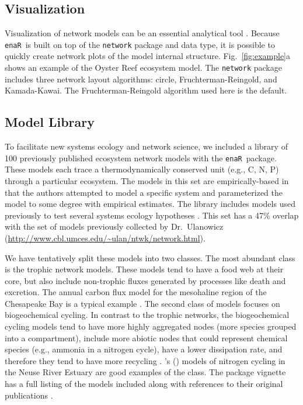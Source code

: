 \documentclass[11pt]{article}
\def\citeapos#1{\citeauthor{#1}'s (\citeyear{#1})}
\newcommand{\enaR}{\texttt{enaR}}
\begin{document}
\begin{spacing}{2}
\subsection{Visualization}
Visualization of network models can be an essential analytical tool
\citep{moody05dynamic,lima2011visual}.  Because \enaR\ is built on top
of the \texttt{network} package and data type, it is possible to
quickly create network plots of the model internal structure.
Fig.~\ref{fig:example}a shows an example of the Oyster Reef ecosystem
model.  The \texttt{network} package includes three network layout
algorithms: circle, Fruchterman-Reingold, and Kamada-Kawai.  The
Fruchterman-Reingold algorithm used here is the default.

\subsection{Model Library}
To facilitate new systems ecology and network science, we included a
library of 100 previously published ecosystem network models with the
\enaR\ package. These models each trace a thermodynamically conserved
unit (e.g., C, N, P) through a particular ecosystem.  The models in
this set are empirically-based in that the authors attempted to model
a specific system and parameterized the model to some degree with
empirical estimates.  The library includes models used previously to
test several systems ecology hypotheses \citep{borrett10_idd,
  borrett10_hmg, salas11_did, borrett13}.  This set has a 47\%
overlap with the set of models previously collected by Dr.\ Ulanowicz
(\url{http://www.cbl.umces.edu/~ulan/ntwk/network.html}).

We have tentatively split these models into two classes.  The most
abundant class is the trophic network models. %
These models tend to have a food web at their core, but also include
non-trophic fluxes generated by processes like death and excretion.
The annual carbon flux model for the mesohaline region of the
Chesapeake Bay is a typical example \citep{baird89}.  The second class
of models focuses on biogeochemical cycling.  %
In contrast to the trophic networks, the biogeochemical cycling models
tend to have more highly aggregated nodes (more species grouped into a
compartment), include more abiotic nodes that could represent chemical
species (e.g., ammonia in a nitrogen cycle), have a lower dissipation
rate, and therefore they tend to have more recycling
\citep{christian96, borrett10_idd}.  \citeapos{christian03} models of
nitrogen cycling in the Neuse River Estuary are good examples of the
class.  The package vignette has a full listing of the models included
along with references to their original publications \citep{enar}.


\end{spacing}
\end{document}
